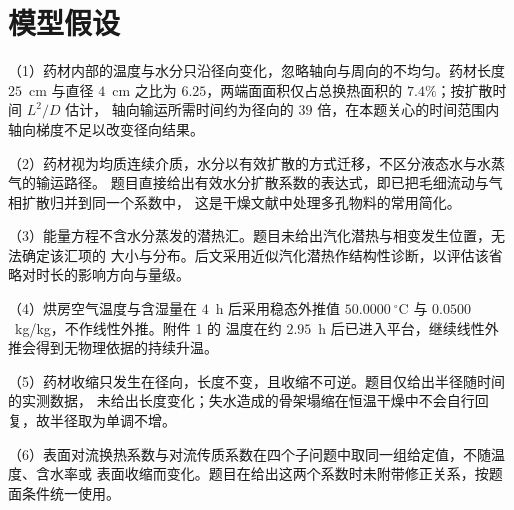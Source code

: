 \section{模型假设}

（1）药材内部的温度与水分只沿径向变化，忽略轴向与周向的不均匀。药材长度 $25$~cm 与直径
$4$~cm 之比为 $6.25$，两端面面积仅占总换热面积的 $7.4\%$；按扩散时间 $L^2/D$ 估计，
轴向输运所需时间约为径向的 $39$ 倍，在本题关心的时间范围内轴向梯度不足以改变径向结果。

（2）药材视为均质连续介质，水分以有效扩散的方式迁移，不区分液态水与水蒸气的输运路径。
题目直接给出有效水分扩散系数的表达式，即已把毛细流动与气相扩散归并到同一个系数中，
这是干燥文献中处理多孔物料的常用简化。

（3）能量方程不含水分蒸发的潜热汇。题目未给出汽化潜热与相变发生位置，无法确定该汇项的
大小与分布。后文采用近似汽化潜热作结构性诊断，以评估该省略对时长的影响方向与量级。

（4）烘房空气温度与含湿量在 $4$~h 后采用稳态外推值 $50.0000~^\circ$C 与 $0.0500$~kg/kg，不作线性外推。附件 1 的
温度在约 $2.95$~h 后已进入平台，继续线性外推会得到无物理依据的持续升温。

（5）药材收缩只发生在径向，长度不变，且收缩不可逆。题目仅给出半径随时间的实测数据，
未给出长度变化；失水造成的骨架塌缩在恒温干燥中不会自行回复，故半径取为单调不增。

（6）表面对流换热系数与对流传质系数在四个子问题中取同一组给定值，不随温度、含水率或
表面收缩而变化。题目在给出这两个系数时未附带修正关系，按题面条件统一使用。
